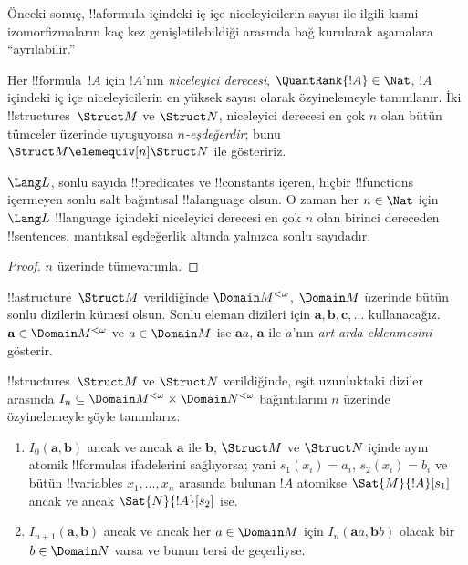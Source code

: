 Önceki sonuç, !!a{formula} içindeki iç içe niceleyicilerin sayısı ile
ilgili kısmi izomorfizmaların kaç kez genişletilebildiği arasında bağ
kurularak aşamalara ``ayrılabilir.''

\begin{defn}
  Her !!{formula}~$!A$ için $!A$'nın \emph{niceleyici derecesi},
  $\QuantRank{!A}\in\Nat$, $!A$ içindeki iç içe niceleyicilerin en
  yüksek sayısı olarak özyinelemeyle tanımlanır. İki
  !!{structure}s~$\Struct M$ ve $\Struct N$, niceleyici derecesi en çok
  $n$ olan bütün tümceler üzerinde uyuşuyorsa \emph{$n$-eşdeğerdir};
  bunu $\Struct M\elemequiv[n]\Struct N$ ile gösteririz.
\end{defn}

\begin{prop}
  $\Lang L$, sonlu sayıda !!{predicate}s ve !!{constant}s içeren,
  hiçbir !!{function}s içermeyen sonlu salt bağıntısal !!a{language}
  olsun. O zaman her $n\in\Nat$ için $\Lang L$ !!{language} içindeki
  niceleyici derecesi en çok $n$ olan birinci dereceden
  !!{sentence}s, mantıksal eşdeğerlik altında yalnızca sonlu sayıdadır.
\end{prop}

\begin{proof}
  $n$ üzerinde tümevarımla.
\end{proof}

\begin{defn}
  !!a{structure}~$\Struct M$ verildiğinde $\Domain M^{<\omega}$,
  $\Domain M$ üzerinde bütün sonlu dizilerin kümesi olsun. Sonlu eleman
  dizileri için $\mathbf a,\mathbf b,\mathbf c,\ldots$ kullanacağız.
  $\mathbf a\in\Domain M^{<\omega}$ ve $a\in\Domain M$ ise
  $\mathbf aa$, $\mathbf a$ ile $a$'nın \emph{art arda eklenmesini}
  gösterir.
\end{defn}

\begin{defn}
  !!{structure}s~$\Struct M$ ve $\Struct N$ verildiğinde, eşit
  uzunluktaki diziler arasında
  $I_n\subseteq\Domain M^{<\omega}\times\Domain N^{<\omega}$
  bağıntılarını $n$ üzerinde özyinelemeyle şöyle tanımlarız:
   \begin{enumerate}
   \item $I_0(\mathbf a,\mathbf b)$ ancak ve ancak $\mathbf a$ ile
     $\mathbf b$, $\Struct M$ ve $\Struct N$ içinde aynı atomik
     !!{formula}s ifadelerini sağlıyorsa; yani $s_1(x_i)=a_i$,
     $s_2(x_i)=b_i$ ve bütün !!{variable}s $x_1,\dots,x_n$ arasında
     bulunan $!A$ atomikse $\Sat{M}{!A}[s_1]$ ancak ve ancak
     $\Sat{N}{!A}[s_2]$ ise.
   \item $I_{n+1}(\mathbf a,\mathbf b)$ ancak ve ancak her
     $a\in\Domain M$ için $I_n(\mathbf aa,\mathbf bb)$ olacak bir
     $b\in\Domain N$ varsa ve bunun tersi de geçerliyse.
   \end{enumerate}
\end{defn}

